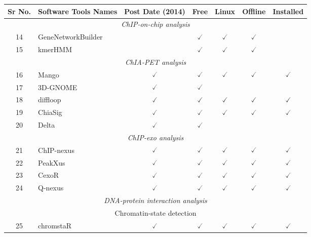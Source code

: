 \documentclass[10pt,letterpaper]{article}
\begin{document}
\begin{table}[!ht]
\begin{adjustwidth}{-2.25in}{0in} %
\centering
\begin{tabular}{|c|l|c|c|c|c|c|}
\hline
Sr No. & Software Tools Names & Post Date (2014) & Free & Linux & Offline & Installed \\ 
\hline
\hline
\multicolumn{7}{|c|}{\textit{ChIP-on-chip analysis}} \\ \hline
\hline
14 & GeneNetworkBuilder\cite{ou2013genenetworkbuilder} & & $\checked$ & $\checked$ & $\checked$ & \\ 
15 & kmerHMM\cite{wong2013dna} & & $\checked$ & $\checked$ & $\checked$ & \\ \hline
\hline
\multicolumn{7}{|c|}{\textit{ChIA-PET analysis}} \\ \hline
\hline
16 &  Mango\cite{phanstiel2015mango} &  $\checked$ & $\checked$ & $\checked$ & $\checked$ & $\checked$ \\ 
17   & 3D-GNOME\cite{szalaj20163d} & $\checked$ & $\checked$ &  &  &  \\ 
18 & diffloop\cite{lareau2017diffloop} &  $\checked$ & $\checked$ & $\checked$ & $\checked$ & $\checked$ \\ 
19 & ChiaSig\cite{paulsen2014statistical} &  $\checked$ & $\checked$ & $\checked$ & $\checked$ & $\checked$ \\ 
20 & Delta\cite{tang2017delta} &  $\checked$ & $\checked$ &  &  & \\ \hline
\hline
\multicolumn{7}{|c|}{\textit{ChIP-exo analysis}} \\ \hline
\hline
21 & ChIP-nexus\cite{he2015chip} & $\checked$ & $\checked$ & $\checked$ & $\checked$ & $\checked$ \\ 
22 & PeakXus\cite{hartonen2016peakxus} & $\checked$ & $\checked$ & $\checked$ & $\checked$ & $\checked$ \\ 
23 & CexoR\cite{madrigal2015cexor} & $\checked$ & $\checked$ & $\checked$ & $\checked$ & $\checked$ \\ 
24 & Q-nexus\cite{hansen2016q} & $\checked$ & $\checked$ & $\checked$ & $\checked$ & $\checked$ \\ \hline
\hline
\multicolumn{7}{|c|}{\textit{DNA-protein interaction analysis}} \\ \hline
\hline
\multicolumn{7}{|c|}{Chromatin-state detection} \\ \hline
\hline
25 & chromstaR\cite{taudt2016chromstar} & $\checked$ & $\checked$ & $\checked$ & $\checked$ & $\checked$ \\ 

\end{tabular}
\end{adjustwidth}
\end{table}
\end{document}
